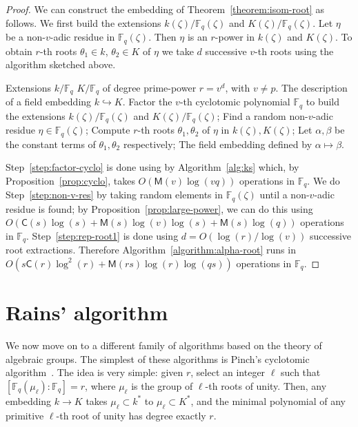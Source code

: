 \documentclass[12pt]{article}
\theoremstyle{plain}
\theoremstyle{definition}
\def\F{\ensuremath{\mathbb{F}}}
\def\MM{\ensuremath{\mathsf{M}}}
\def\CC{\ensuremath{\mathsf{C}}}
\newcounter{algorithm}
\begin{document}
\begin{proof}
We can construct the embedding of Theorem~\ref{theorem:isom-root} as follows. We first build the 
extensions $k(\zeta) / \F_q(\zeta)$ and $K(\zeta)/\F_q(\zeta)$. Let $\eta$ be a non-$v$-adic residue in $\F_q(\zeta)$. 
Then $\eta$ is an $r$-power in $k(\zeta)$ and $K(\zeta)$. To obtain $r$-th roots $\theta_1\in k$, $\theta_2\in K$ of $\eta$ we take $d$ 
successive $v$-th roots using the algorithm sketched above. 

\begin{algorithm}
	\label{algorithm:alpha-root}
	\begin{algorithmic}[1]
		\REQUIRE Extensions $k / \F_q$ $K/\F_q$ of degree prime-power $r = v^d$, with $v\ne p$.
		\ENSURE The description of a field embedding $k\hookrightarrow K$.
		\STATE\label{step:factor-cyclo} Factor the $v$-th cyclotomic polynomial $\F_q$ to 
		build the extensions $k(\zeta) / \F_q(\zeta)$ and $K(\zeta)/\F_q(\zeta)$;
		\STATE\label{step:non-v-res} Find a random non-$v$-adic residue $\eta \in \F_q(\zeta)$;
		\STATE\label{step:rep-root1} Compute $r$-th roots $\theta_1,\theta_2$ of $\eta$ in $k(\zeta),K(\zeta)$;
		\STATE Let $\alpha, \beta$ be the constant terms of $\theta_1, \theta_2$ respectively;
		\RETURN The field embedding defined by $\alpha\mapsto\beta$.
	\end{algorithmic}
\end{algorithm}

Step~\ref{step:factor-cyclo} is done using by Algorithm~\ref{alg:ks} which, by Proposition~\ref{prop:cyclo}, takes $O(\MM(v)\log(vq))$ operations in $\F_q$. We do Step~\ref{step:non-v-res} by taking random elements in $\F_q(\zeta)$ until a non-$v$-adic residue is found; by Proposition~\ref{prop:large-power},
we can do this using $O(\CC(s)\log(s) + \MM(s)\log(v)\log(s) + \MM(s)\log(q))$ operations in 
$\F_q$. Step~\ref{step:rep-root1} is done using $d = O(\log(r) / \log(v))$ successive root 
extractions. Therefore Algorithm~\ref{algorithm:alpha-root} runs in $O(s\CC(r)\log^2(r) + 
\MM(rs)\log(r)\log(qs))$ operations in $\F_q$.
\end{proof}




\section{Rains' algorithm}
\label{sec:rains-algorithm}

We now move on to a different family of algorithms based on the theory of
algebraic groups. The simplest of these algorithms is Pinch's
cyclotomic algorithm~\cite{Pinch}. The idea is very simple: given $r$,
select an integer $\ell$ such that $[\F_q(\mu_\ell):\F_q]=r$, where
$\mu_\ell$ is the group of $\ell$-th roots of unity.  Then, any
embedding $k\to K$ takes $\mu_\ell\subset k^\ast$ to $\mu_\ell\subset
K^\ast$, and the minimal polynomial of any primitive $\ell$-th root of
unity has degree exactly $r$.
\end{document}
